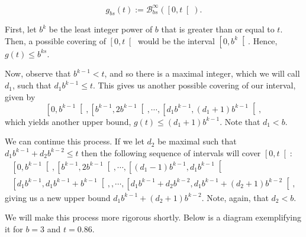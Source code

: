 \documentclass[11pt, reqno]{amsart}
\newcommand{\BB}{\mathcal{B}}
\begin{document}
\[g_{bs}(t) := \BB_{bs}^\infty(\left[0, t \right[).\]

First, let $b^k$ be the least integer power of $b$ that is greater than or equal to $t$. Then, a possible covering of $\left[0, t \right[$ would be the interval $\left[0, b^k\right[$. Hence, $g(t) \leq b^{ks}$.

Now, observe that $b^{k-1} < t$, and so there is a maximal integer, which we will call $d_1$, such that $d_1 b^{k-1} \leq t$. This gives us another possible covering of our interval, given by
\[\left[0, b^{k-1} \right[, \left[b^{k-1}, 2 b^{k-1} \right[, \cdots, \left[d_1 b^{k-1}, (d_1 + 1) b^{k-1} \right[,\]
which yields another upper bound, $g(t) \leq (d_1 + 1) b^{k-1}$. Note that $d_1 < b$.

We can continue this process. If we let $d_2$ be maximal such that $d_1 b^{k-1} + d_2 b^{k-2} \leq t$ then the following sequence of intervals will cover $\left[0, t \right[$:
\begin{multline*}
\left[0, b^{k-1} \right[, \left[b^{k-1}, 2 b^{k-1} \right[, \cdots, \left[(d_1 - 1) b^{k-1}, d_1 b^{k-1} \right[ \\
\left[d_1 b^{k-1}, d_1 b^{k-1} + b^{k-1} \right[, , \cdots, \left[d_1 b^{k-1} + d_2 b^{k-2}, d_1 b^{k-1} + (d_2 + 1) b^{k-2} \right[,
\end{multline*}
giving us a new upper bound $d_1 b^{k-1} + (d_2 + 1) b^{k-2}$. Note, again, that $d_2 < b$.

We will make this process more rigorous shortly. Below is a diagram exemplifying it for $b = 3$ and $t = 0.86$.
\end{document}
